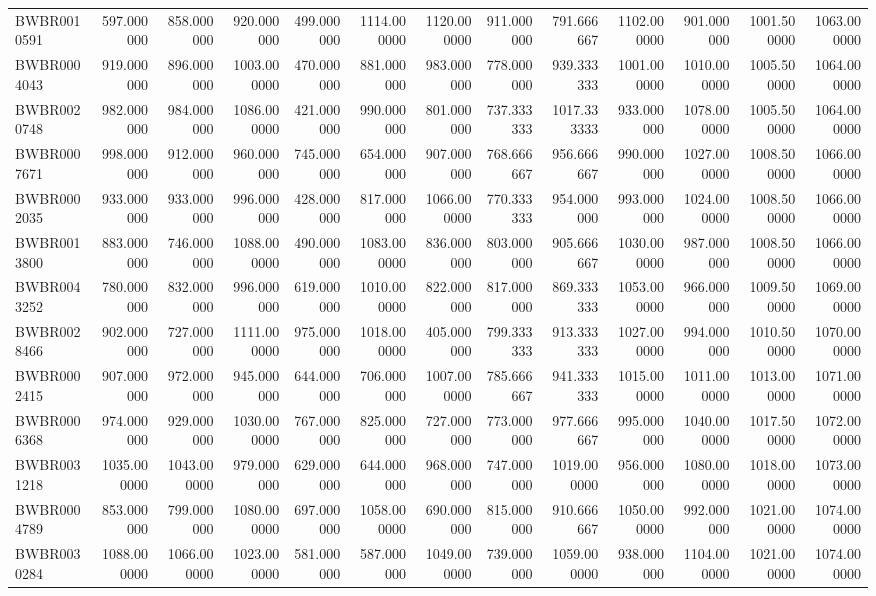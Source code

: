 \begin{longtable}{lrrrrrrrrrrrr}
BWBR0010591 & 597.000000 & 858.000000 & 920.000000 & 499.000000 & 1114.000000 & 1120.000000 & 911.000000 & 791.666667 & 1102.000000 & 901.000000 & 1001.500000 & 1063.000000 \\
BWBR0004043 & 919.000000 & 896.000000 & 1003.000000 & 470.000000 & 881.000000 & 983.000000 & 778.000000 & 939.333333 & 1001.000000 & 1010.000000 & 1005.500000 & 1064.000000 \\
BWBR0020748 & 982.000000 & 984.000000 & 1086.000000 & 421.000000 & 990.000000 & 801.000000 & 737.333333 & 1017.333333 & 933.000000 & 1078.000000 & 1005.500000 & 1064.000000 \\
BWBR0007671 & 998.000000 & 912.000000 & 960.000000 & 745.000000 & 654.000000 & 907.000000 & 768.666667 & 956.666667 & 990.000000 & 1027.000000 & 1008.500000 & 1066.000000 \\
BWBR0002035 & 933.000000 & 933.000000 & 996.000000 & 428.000000 & 817.000000 & 1066.000000 & 770.333333 & 954.000000 & 993.000000 & 1024.000000 & 1008.500000 & 1066.000000 \\
BWBR0013800 & 883.000000 & 746.000000 & 1088.000000 & 490.000000 & 1083.000000 & 836.000000 & 803.000000 & 905.666667 & 1030.000000 & 987.000000 & 1008.500000 & 1066.000000 \\
BWBR0043252 & 780.000000 & 832.000000 & 996.000000 & 619.000000 & 1010.000000 & 822.000000 & 817.000000 & 869.333333 & 1053.000000 & 966.000000 & 1009.500000 & 1069.000000 \\
BWBR0028466 & 902.000000 & 727.000000 & 1111.000000 & 975.000000 & 1018.000000 & 405.000000 & 799.333333 & 913.333333 & 1027.000000 & 994.000000 & 1010.500000 & 1070.000000 \\
BWBR0002415 & 907.000000 & 972.000000 & 945.000000 & 644.000000 & 706.000000 & 1007.000000 & 785.666667 & 941.333333 & 1015.000000 & 1011.000000 & 1013.000000 & 1071.000000 \\
BWBR0006368 & 974.000000 & 929.000000 & 1030.000000 & 767.000000 & 825.000000 & 727.000000 & 773.000000 & 977.666667 & 995.000000 & 1040.000000 & 1017.500000 & 1072.000000 \\
BWBR0031218 & 1035.000000 & 1043.000000 & 979.000000 & 629.000000 & 644.000000 & 968.000000 & 747.000000 & 1019.000000 & 956.000000 & 1080.000000 & 1018.000000 & 1073.000000 \\
BWBR0004789 & 853.000000 & 799.000000 & 1080.000000 & 697.000000 & 1058.000000 & 690.000000 & 815.000000 & 910.666667 & 1050.000000 & 992.000000 & 1021.000000 & 1074.000000 \\
BWBR0030284 & 1088.000000 & 1066.000000 & 1023.000000 & 581.000000 & 587.000000 & 1049.000000 & 739.000000 & 1059.000000 & 938.000000 & 1104.000000 & 1021.000000 & 1074.000000 \\

\end{longtable}
